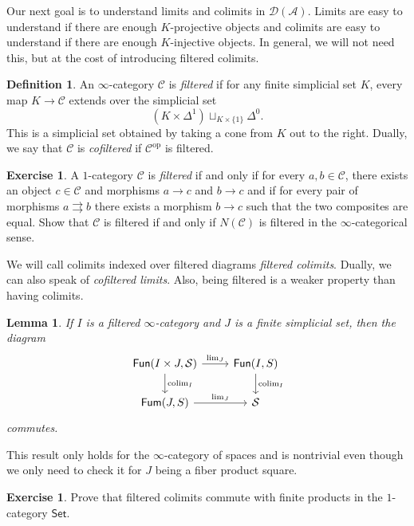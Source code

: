 \documentclass[10pt, oneside]{memoir}
\newtheorem{lem}[thm]{Lemma}
\theoremstyle{definition}
\newtheorem{defn}[thm]{Definition}
\newtheorem{exer}[thm]{Exercise}
\theoremstyle{remark}
\theoremstyle{plain}
\theoremstyle{definition}
\theoremstyle{remark}
\newcommand{\mc}[1]{\mathcal{#1}}
\newcommand{\ms}[1]{\mathsf{#1}}
\newcommand{\1}{\mathbf{1}}
\newcommand{\2}{\mathbf{2}}
\newcommand{\3}{\mathbf{3}}
\DeclareMathOperator{\op}{op}
\DeclareMathOperator*{\colim}{colim}
\begin{document}
Our next goal is to understand limits and colimits in $\mc{D}(\mc{A})$. Limits are easy to understand if there are enough $K$-projective objects and colimits are easy to understand if there are enough $K$-injective objects. In general, we will not need this, but at the cost of introducing filtered colimits.

\begin{defn}
    An $\infty$-category $\mc{C}$ is \textit{filtered} if for any finite simplicial set $K$, every map $K \to \mc{C}$ extends over the simplicial set
    \[ (K \times \Delta^1) \sqcup_{K \times \{1\}} \Delta^0. \]
    This is a simplicial set obtained by taking a cone from $K$ out to the right. Dually, we say that $\mc{C}$ is \textit{cofiltered} if $\mc{C}^{\op}$ is filtered.
\end{defn}

\begin{exer}
    A $1$-category $\mc{C}$ is \textit{filtered} if and only if for every $a, b \in \mc{C}$, there exists an object $c \in \mc{C}$ and morphisms $a \to c$ and $b\to c$ and if for every pair of morphisms $a \rightrightarrows b$ there exists a morphism $b \to c$ such that the two composites are equal. Show that $\mc{C}$ is filtered if and only if $N(\mc{C})$ is filtered in the $\infty$-categorical sense.
\end{exer}

We will call colimits indexed over filtered diagrams \textit{filtered colimits}. Dually, we can also speak of \textit{cofiltered limits}. Also, being filtered is a weaker property than having colimits.

\begin{lem}
    If $I$ is a filtered $\infty$-category and $J$ is a finite simplicial set, then the diagram
    \begin{equation*}
    \begin{tikzcd}
        \ms{Fun}(I \times J, \mc{S}) \ar{d}{\colim_I} \ar{r}{\lim_J} & \ms{Fun}(I, S) \ar{d}{\colim_I} \\
        \ms{Fum}(J, S) \ar{r}{\lim_J} & \mc{S}
    \end{tikzcd}
    \end{equation*}
    commutes.
\end{lem}

This result only holds for the $\infty$-category of spaces and is nontrivial even though we only need to check it for $J$ being a fiber product square.

\begin{exer}
    Prove that filtered colimits commute with finite products in the $1$-category $\ms{Set}$.
\end{exer}
\end{document}
